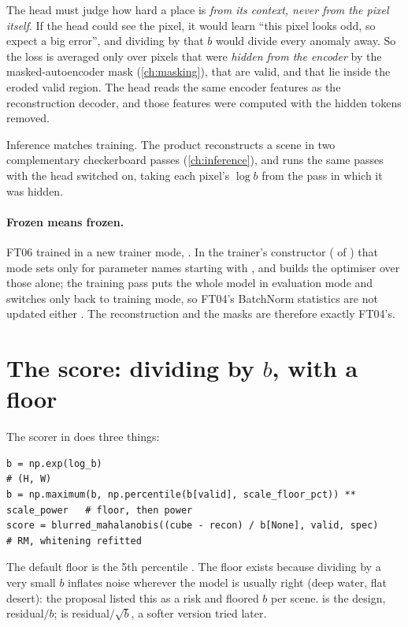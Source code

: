 The head must judge how hard a place is \emph{from its context, never from the pixel itself}. If the head
could see the pixel, it would learn ``this pixel looks odd, so expect a big error'', and dividing by that $b$
would divide every anomaly away. So the loss is averaged only over pixels that were \emph{hidden from the
encoder} by the masked-autoencoder mask (\cref{ch:masking}), that are valid, and that lie inside the eroded
valid region. The head reads the same encoder features as the reconstruction decoder, and those features were
computed with the hidden tokens removed.

Inference matches training. The product reconstructs a scene in two complementary checkerboard passes
(\cref{ch:inference}), and  runs the same passes with the head switched on,
taking each pixel's $\log b$ from the pass in which it was hidden.

\paragraph{Frozen means frozen.} FT06 trained in a new trainer mode, . In the
trainer's constructor ( of ) that mode sets  only for parameter names starting
with , and builds the optimiser over those alone; the training pass puts the whole model in
evaluation mode and switches only  back to training mode, so FT04's BatchNorm statistics are not
updated either . The reconstruction and the masks are therefore exactly FT04's.

\section{The score: dividing by \texorpdfstring{$b$}{b}, with a floor}\label{sec:uncertainty:score}

The scorer  in  does three things:
\begin{lstlisting}
b = np.exp(log_b)                                                       # (H, W)
b = np.maximum(b, np.percentile(b[valid], scale_floor_pct)) ** scale_power   # floor, then power
score = blurred_mahalanobis((cube - recon) / b[None], valid, spec)       # RM, whitening refitted
\end{lstlisting}
The default floor is the 5th percentile . The floor exists because dividing by
a very small $b$ inflates noise wherever the model is usually right (deep water, flat desert): the proposal
listed this as a risk and floored $b$ per scene.  is the design, residual$/b$;
 is residual$/\sqrt b$, a softer version tried later.

